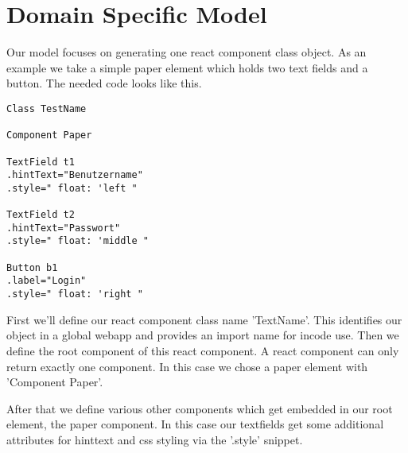 \chapter{Domain Specific Model}
Our model focuses on generating one react component class object. As an example we take a simple paper element which holds two text fields and a button. The needed code looks like this.

\begin{lstlisting}
Class TestName

Component Paper

TextField t1
.hintText="Benutzername"
.style=" float: 'left "

TextField t2
.hintText="Passwort"
.style=" float: 'middle "

Button b1
.label="Login"
.style=" float: 'right "

\end{lstlisting}

First we'll define our react component class name 'TextName'. This identifies our object in a global webapp and provides an import name for incode use. Then we define the root component of this react component. A react component can only return exactly one component. In this case we chose a paper element with 'Component Paper'.

After that we define various other components which get embedded in our root element, the paper component. In this case our textfields get some additional attributes for hinttext and css styling via the '.style' snippet.

